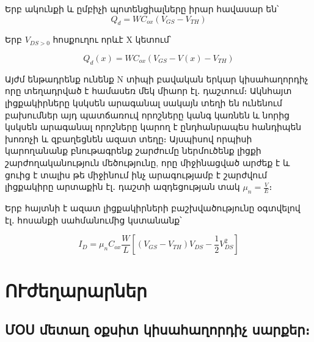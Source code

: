 \documentclass[
]{book}
\theoremstyle{definition}
\theoremstyle{definition}
\theoremstyle{definition}
\theoremstyle{definition}
\theoremstyle{remark}
\begin{document}
\begin{blackbox}

\begin{lf}

\begin{center}
Երբ ակունքի և ըմբիչի պոտենցիալները իրար հավասար են՝
\[Q_d = WC_{ox}(V_{GS} - V_{TH})\]

\end{center}

\end{lf}

\begin{rig}

\begin{center}
Երբ \(V_{DS>0}\) հոսքուղու որևէ X կետում՝

\[Q_d(x) = WC_{ox}(V_{GS} -V(x) - V_{TH})\]

\end{center}

\end{rig}

\end{blackbox}

Այժմ ենթադրենք ունենք N տիպի բավական երկար կիսահաղորդիչ որը տեղադրված է համասեռ մեկ
միաոր էլ․ դաշտում։ Ակնհայտ լիցքակիրները կսկսեն արագանալ սակայն տեղի են ունենում
բախումներ այդ պատճառուվ որոշները կանգ կառնեն և նորից կսկսեն արագանալ որոշները կարող է
ընդհանրապես հանդիպեն խոռոչի և զբաղեցնեն ազատ տեղը։ Այսպիսով որպիսի կարողանանք
բնութագրենք շարժումը ներմուծենք լիցքի շարժողականություն մեծությունը, որը միջինացված
արժեք է և ցուից է տալիս թե միջինում ինչ արագությամբ է շարժվում լիցքակիրը արտաքին
էլ․ դաշտի ազդեցության տակ \(μ_n = \frac{V}{E}\)։

Երբ հայտնի է ազատ լիցքակիրների բաշխվածությունը օգտվելով էլ․ հոսանքի սահմանումից կստանանք՝

\[I_{D} = μ_n C_{ox} \frac{W}{L}[(V_{GS} - V_{TH})V_{DS} - \frac{1}{2}V_{DS}^2]\]

\hypertarget{ux578ux582ux56aux565ux572ux561ux580ux561ux580ux576ux565ux580}{%
\chapter{ՈՒժեղարարներ}\label{ux578ux582ux56aux565ux572ux561ux580ux561ux580ux576ux565ux580}}

\hypertarget{ux574ux585ux57d-ux574ux565ux57fux561ux572-ux585ux584ux57dux56bux57f-ux56fux56bux57dux561ux570ux561ux572ux578ux580ux564ux56bux579-ux57dux561ux580ux584ux565ux580}{%
\section{ՄՕՍ մետաղ օքսիտ կիսահաղորդիչ սարքեր։}\label{ux574ux585ux57d-ux574ux565ux57fux561ux572-ux585ux584ux57dux56bux57f-ux56fux56bux57dux561ux570ux561ux572ux578ux580ux564ux56bux579-ux57dux561ux580ux584ux565ux580}}
\end{document}
